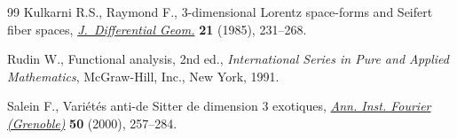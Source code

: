 \documentclass[10pt,a4paper]{amsart}
\numberwithin{equation}{section}
\begin{document}
\begin{thebibliography}{99}
Kulkarni R.S., Raymond F., {$3$}-dimensional {L}orentz space-forms and
 {S}eifert fiber spaces, \href{https://doi.org/10.4310/jdg/1214439564}{\textit{J.~Differential Geom.}} \textbf{21} (1985),
 231--268.

Rudin W., Functional analysis, 2nd ed., \textit{International Series in Pure and
 Applied Mathematics}, McGraw-Hill, Inc., New York, 1991.

Salein F., Vari\'et\'es anti-de {S}itter de dimension 3 exotiques, \href{https://doi.org/10.5802/aif.1754}{\textit{Ann.
 Inst. Fourier (Grenoble)}} \textbf{50} (2000), 257--284.

\end{thebibliography}
\end{document}
